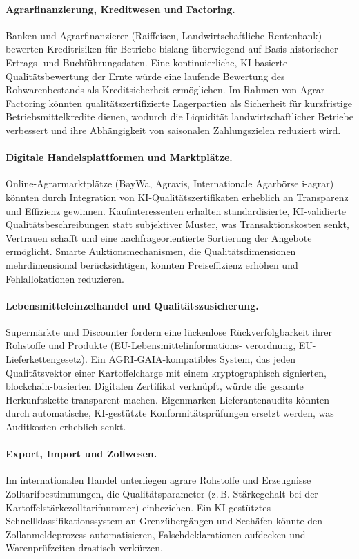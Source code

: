﻿\documentclass[12pt,a4paper]{article}
\theoremstyle{plain}
\theoremstyle{definition}
\begin{document}
	\paragraph{Agrarfinanzierung, Kreditwesen und Factoring.}
	Banken und Agrarfinanzierer (Raiffeisen, Landwirtschaftliche Rentenbank)
	bewerten Kreditrisiken für Betriebe bislang überwiegend auf Basis
	historischer Ertrags- und Buchführungsdaten. Eine kontinuierliche,
	KI-basierte Qualitätsbewertung der Ernte würde eine laufende
	Bewertung des Rohwarenbestands als Kreditsicherheit ermöglichen.
	Im Rahmen von Agrar-Factoring könnten qualitätszertifizierte
	Lagerpartien als Sicherheit für kurzfristige Betriebsmittelkredite
	dienen, wodurch die Liquidität landwirtschaftlicher Betriebe
	verbessert und ihre Abhängigkeit von saisonalen Zahlungszielen
	reduziert wird.

	\paragraph{Digitale Handelsplattformen und Marktplätze.}
	Online-Agrarmarktplätze (BayWa, Agravis, Internationale Agarbörse
	i-agrar) könnten durch Integration von KI-Qualitätszertifi\-katen
	erheblich an Transparenz und Effizienz gewinnen. Kaufinteressenten
	erhalten standardisierte, KI-validierte Qualitätsbeschreibungen
	statt subjektiver Muster, was Transaktionskosten senkt,
	Vertrauen schafft und eine nachfrageorientierte Sortierung
	der Angebote ermöglicht. Smarte Auktionsmechanismen, die
	Qualitätsdimensionen mehrdimensional berücksichtigen, könnten
	Preiseffizienz erhöhen und Fehlallokationen reduzieren.

	\paragraph{Lebensmitteleinzelhandel und Qualitätszusicherung.}
	Supermärkte und Discounter fordern eine lückenlose
	Rückverfolgbarkeit ihrer Rohstoffe und Produkte (EU-Lebensmittel\-informations-
	verordnung, EU-Lieferkettengesetz). Ein AGRI-GAIA-kompatibles System,
	das jeden Qualitäts\-vektor einer Kartoffelcharge mit einem
	kryptographisch signierten, blockchain-basierten Digitalen Zertifikat
	verknüpft, würde die gesamte Herkunftskette transparent machen.
	Eigenmarken-Lieferantenaudits könnten durch automatische, KI-gestützte
	Konformitätsprüfungen ersetzt werden, was Auditkosten erheblich senkt.

	\paragraph{Export, Import und Zollwesen.}
	Im internationalen Handel unterliegen agrare Rohstoffe und Erzeugnisse
	Zolltarifbestimmungen, die Qualitätsparameter (z.\,B. Stärkegehalt
	bei der Kartoffelstärkezolltarifnummer) einbeziehen. Ein KI-gestütztes
	Schnellklassifikationssystem an Grenzübergängen und Seehäfen könnte
	den Zollanmeldeprozess automatisieren, Falschdeklarationen aufdecken
	und Warenprüfzeiten drastisch verkürzen.
\end{document}
